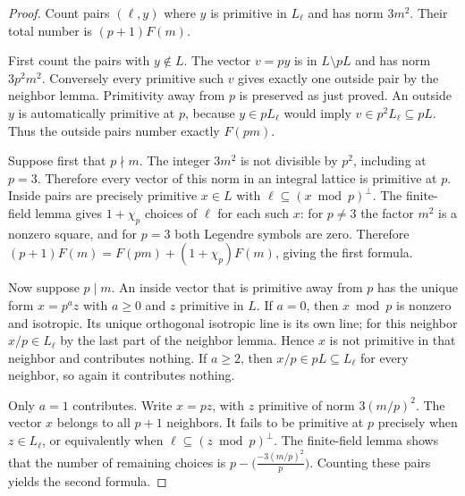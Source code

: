 \begin{proof}
Count pairs $(\ell,y)$ where $y$ is primitive in $L_\ell$ and has
norm $3m^2$. Their total number is $(p+1)F(m)$.

First count the pairs with $y\notin L$. The vector $v=py$ is in
$L\setminus pL$ and has norm $3p^2m^2$. Conversely every primitive
such $v$ gives exactly one outside pair by the neighbor lemma.
Primitivity away from $p$ is preserved as just proved. An outside
$y$ is automatically primitive at $p$, because $y\in pL_\ell$
would imply $v\in p^2L_\ell\subseteq pL$. Thus the outside pairs
number exactly $F(pm)$.

Suppose first that $p\nmid m$. The integer $3m^2$ is not divisible
by $p^2$, including at $p=3$. Therefore every vector of this norm
in an integral lattice is primitive at $p$. Inside pairs are precisely
primitive $x\in L$ with $\ell\subseteq(x\bmod p)^\perp$.
The finite-field lemma gives $1+\chi_p$ choices of $\ell$ for each
such $x$: for $p\ne3$ the factor $m^2$ is a nonzero square, and for
$p=3$ both Legendre symbols are zero. Therefore
$(p+1)F(m)=F(pm)+(1+\chi_p)F(m)$, giving the first formula.

Now suppose $p\mid m$. An inside vector that is primitive away
from $p$ has the unique form $x=p^az$ with $a\ge0$ and $z$
primitive in $L$. If $a=0$, then $x\bmod p$ is nonzero and
isotropic. Its unique orthogonal isotropic line is its own line;
for this neighbor $x/p\in L_\ell$ by the last part of the neighbor
lemma. Hence $x$ is not primitive in that neighbor and contributes
nothing. If $a\ge2$, then $x/p\in pL\subseteq L_\ell$ for every
neighbor, so again it contributes nothing.

Only $a=1$ contributes. Write $x=pz$, with $z$ primitive of norm
$3(m/p)^2$. The vector $x$ belongs to all $p+1$ neighbors. It fails
to be primitive at $p$ precisely when $z\in L_\ell$, or equivalently
when $\ell\subseteq(z\bmod p)^\perp$. The finite-field lemma shows
that the number of remaining choices is
$p-\bigl(\frac{-3(m/p)^2}{p}\bigr)$. Counting these pairs yields
the second formula.
\end{proof}

